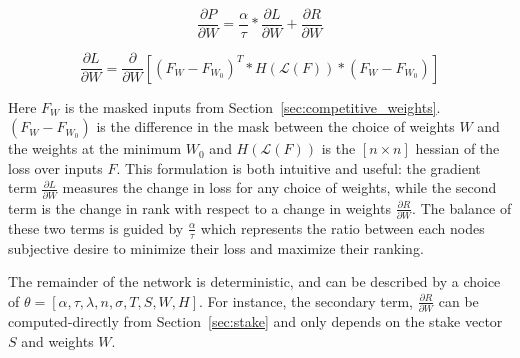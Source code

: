 \documentclass{article}
\begin{document}
\begin{equation}
\label{eq:iterative_descent1}
\frac{\partial P}{\partial W} = \frac{\alpha}{\tau} * \frac{\partial L}{\partial W} + \frac{\partial R}{\partial W}
\end{equation}


\begin{equation}
\label{eq:iterative_descent2}
\frac{\partial L}{\partial W} = \frac{\partial}{\partial W} [(F_W - F_{W_0})^T * H( \mathcal{L}(F)) * (F_W - F_{W_0})] 
\end{equation}

Here $F_W$ is the masked inputs from Section~\ref{sec:competitive_weights}. $(F_W - F_{W_0})$ is the difference in the mask between the choice of weights $W$ and the weights at the minimum $W_0$ and $H( \mathcal{L}(F))$ is the $[n \times n]$ hessian of the loss over inputs $F$. This formulation is both intuitive and useful: the gradient term $\frac{\partial L}{\partial W}$ measures the change in loss for any choice of weights, while the second term is the change in rank with respect to a change in weights $\frac{\partial R}{\partial W}$. The balance of these two terms is guided by $\frac{\alpha}{\tau}$ which represents the ratio between each nodes subjective desire to minimize their loss and maximize their ranking.

The remainder of the network is deterministic, and can be described by a choice of $\theta = [\alpha, \tau, \lambda, n, \sigma, T, S, W, H]$. For instance, the secondary term, $\frac{\partial R}{\partial W}$ can be computed-directly from Section~\ref{sec:stake} and only depends on the stake vector $S$ and weights $W$.
\end{document}
